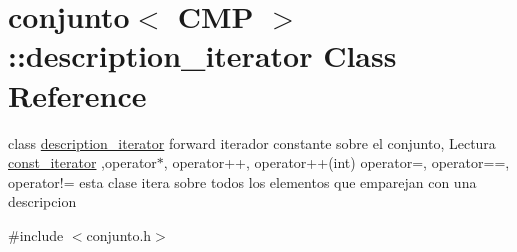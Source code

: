 \hypertarget{classconjunto_1_1description__iterator}{}\section{conjunto$<$ C\+M\+P $>$\+:\+:description\+\_\+iterator Class Reference}
\label{classconjunto_1_1description__iterator}


class \hyperlink{classconjunto_1_1description__iterator}{description\+\_\+iterator} forward iterador constante sobre el conjunto, Lectura \hyperlink{classconjunto_1_1const__iterator}{const\+\_\+iterator} ,operator$\ast$, operator++, operator++(int) operator=, operator==, operator!= esta clase itera sobre todos los elementos que emparejan con una descripcion  




{\ttfamily \#include $<$conjunto.\+h$>$}

